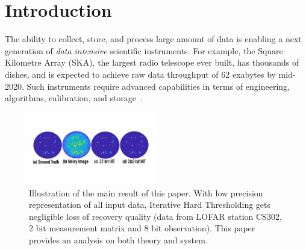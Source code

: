 \documentclass{article}
\begin{document}
\section{Introduction}

The ability to collect, store, and process large amount of
data is enabling a next generation of {\em data intensive} scientific 
instruments. For example,
the Square Kilometre Array (SKA), the largest
radio telescope ever built, has thousands of 
dishes, and is expected to achieve
raw data throughput of 62 exabytes by mid-2020.
Such instruments require advanced  
capabilities in terms of engineering, algorithms, calibration, and storage~\cite{hu}. 

\begin{figure}\label{sky_images}
  \centering
    \includegraphics[width=0.5\textwidth]{figs/sky_images2.pdf}
  \caption{Illustration of the main result of this paper. With
  low precision representation of all input data, 
  Iterative Hard Thresholding gets negligible loss of recovery quality (data from LOFAR station CS302, 2 bit measurement matrix and 8 bit observation). This paper provides an analysis
  on both theory and system.}
  \label{fig:sky_images}
\end{figure}
\end{document}
